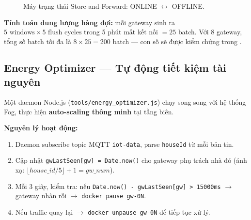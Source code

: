 \documentclass[13pt,a4paper]{report}
\newcommand{\code}[1]{\texttt{\small #1}}
\begin{document}
\begin{figure}[H]
\centering
{}
\caption{Máy trạng thái Store-and-Forward: ONLINE $\leftrightarrow$ OFFLINE.}
\label{fig:saf-sm}
\end{figure}

\textbf{Tính toán dung lượng hàng đợi:} mỗi gateway sinh ra
$5 \text{ windows} \times 5 \text{ flush cycles}$ trong 5 phút mất kết nối
$= 25$ batch. Với 8 gateway, tổng số batch tối đa là $8 \times 25 = 200$ batch ---
con số sẽ được kiểm chứng trong .

\subsection{Energy Optimizer --- Tự động tiết kiệm tài nguyên}
\label{sec:energy}

Một daemon Node.js (\code{tools/energy\_optimizer.js}) chạy song song với hệ
thống Fog, thực hiện \textbf{auto-scaling thông minh} tại tầng biên.

\textbf{Nguyên lý hoạt động:}
\begin{enumerate}
  \item Daemon subscribe topic MQTT \code{iot-data}, parse \code{houseId} từ mỗi
        bản tin.
  \item Cập nhật \code{gwLastSeen[gw] = Date.now()} cho gateway phụ trách nhà đó
        (ánh xạ: $\lfloor house\_id / 5 \rfloor + 1 = gw\_num$).
  \item Mỗi 3 giây, kiểm tra: nếu
        \code{Date.now() - gwLastSeen[gw] > 15000ms} $\to$ gateway nhàn rỗi $\to$
        \code{docker pause gw-0N}.
  \item Nếu traffic quay lại $\to$ \code{docker unpause gw-0N} để tiếp tục xử lý.
\end{enumerate}
\end{document}
